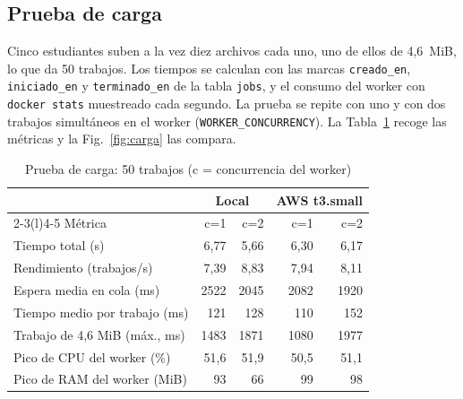 \documentclass[conference,a4paper]{IEEEtran}
\newcommand{\cod}[1]{\texttt{#1}}
\begin{document}
\subsection{Prueba de carga}
Cinco estudiantes suben a la vez diez archivos cada uno, uno de ellos de 4,6~MiB, lo que da 50 trabajos. Los tiempos se calculan con las marcas \cod{creado\_en}, \cod{iniciado\_en} y \cod{terminado\_en} de la tabla \cod{jobs}, y el consumo del worker con \cod{docker stats} muestreado cada segundo. La prueba se repite con uno y con dos trabajos simultáneos en el worker (\cod{WORKER\_CONCURRENCY}). La Tabla~\ref{tab:carga} recoge las métricas y la Fig.~\ref{fig:carga} las compara.

\begin{table}[!t]
\caption{Prueba de carga: 50 trabajos (c = concurrencia del worker)}\label{tab:carga}
\centering\footnotesize
\setlength{\tabcolsep}{3.2pt}
\begin{tabular}{@{}l rr rr@{}}
\toprule
& \multicolumn{2}{c}{Local} & \multicolumn{2}{c}{AWS t3.small}\\
\cmidrule(lr){2-3}\cmidrule(l){4-5}
Métrica & c=1 & c=2 & c=1 & c=2\\
\midrule
Tiempo total (s) & 6,77 & 5,66 & 6,30 & 6,17\\
Rendimiento (trabajos/s) & 7,39 & 8,83 & 7,94 & 8,11\\
Espera media en cola (ms) & 2522 & 2045 & 2082 & 1920\\
Tiempo medio por trabajo (ms) & 121 & 128 & 110 & 152\\
Trabajo de 4,6 MiB (máx., ms) & 1483 & 1871 & 1080 & 1977\\
Pico de CPU del worker (\%) & 51,6 & 51,9 & 50,5 & 51,1\\
Pico de RAM del worker (MiB) & 93 & 66 & 99 & 98\\
\bottomrule
\end{tabular}
\end{table}
\end{document}
